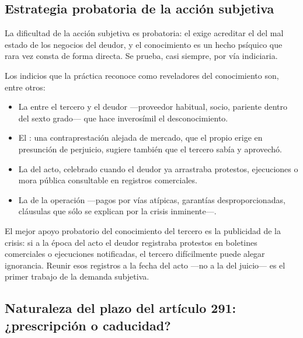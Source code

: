 \subsection{Estrategia probatoria de la acción subjetiva}

La dificultad de la acción subjetiva es probatoria: el  exige acreditar el
 del mal estado de los negocios del deudor, y el
conocimiento es un hecho psíquico que rara vez consta de forma directa. Se prueba, casi
siempre, por vía indiciaria.

Los indicios que la práctica reconoce como reveladores del conocimiento son, entre otros:

\begin{itemize}
  \item La  entre el tercero y el deudor ---proveedor habitual,
  socio, pariente dentro del sexto grado--- que hace inverosímil el desconocimiento.
  \item El : una contraprestación alejada de mercado, que el propio
   erige en presunción de perjuicio, sugiere también que el tercero sabía y aprovechó.
  \item La  del acto, celebrado cuando el deudor ya arrastraba protestos,
  ejecuciones o mora pública consultable en registros comerciales.
  \item La  de la operación ---pagos por vías atípicas, garantías
  desproporcionadas, cláusulas que sólo se explican por la crisis inminente---.
\end{itemize}

\begin{practica}
El mejor apoyo probatorio del conocimiento del tercero es la publicidad de la crisis: si a la
época del acto el deudor registraba protestos en boletines comerciales o ejecuciones
notificadas, el tercero difícilmente puede alegar ignorancia. Reunir esos registros a la fecha
del acto ---no a la del juicio--- es el primer trabajo de la demanda subjetiva.
\end{practica}

\bloqueJurisprudencial

\subsection{Naturaleza del plazo del artículo 291: ¿prescripción o caducidad?}

